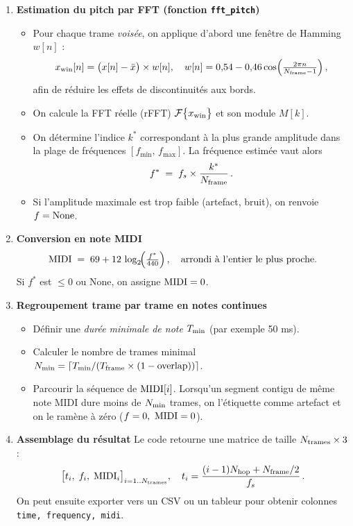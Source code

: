 \begin{enumerate}
\begin{itemize}
    \end{itemize}
  \item \textbf{Estimation du pitch par FFT (fonction \texttt{fft\_pitch}) }  
    \begin{itemize}
      \item Pour chaque trame \emph{voisée}, on applique d’abord une fenêtre de Hamming \(w[n]\) :  
        \[
          x_{\text{win}}[n] = \bigl(x[n] - \bar x\bigr)\times w[n],\quad w[n] = 0{,}54 - 0{,}46\cos\Bigl(\tfrac{2\pi n}{N_\mathrm{frame}-1}\Bigr)\,,
        \]
        afin de réduire les effets de discontinuités aux bords.  
      \item On calcule la FFT réelle (rFFT) \(\mathcal{F}\bigl\{x_{\text{win}}\bigr\}\) et son module \(M[k]\).  
      \item On détermine l’indice \(k^*\) correspondant à la plus grande amplitude dans la plage de fréquences \([f_{\min},\,f_{\max}]\). La fréquence estimée vaut alors  
        \[
          f^* \;=\; f_s \times \frac{k^*}{N_\mathrm{frame}}\,.
        \]
      \item Si l’amplitude maximale est trop faible (artefact, bruit), on renvoie \(f=\text{None}\).  
    \end{itemize}
  \item \textbf{Conversion en note MIDI }  
    \[
      \mathrm{MIDI} \;=\; 69 + 12\,\log_2\!\Bigl(\tfrac{f^*}{440}\Bigr)\,,
      \quad\text{arrondi à l’entier le plus proche.}
    \]
    Si \(f^*\) est \(\le 0\) ou \(\text{None}\), on assigne \(\mathrm{MIDI} = 0\).  
  \item \textbf{Regroupement trame par trame en notes continues }  
    \begin{itemize}
      \item Définir une \emph{durée minimale de note} \(T_\mathrm{min}\) (par exemple 50 ms).  
      \item Calculer le nombre de trames minimal \(N_\mathrm{min} = \lceil T_\mathrm{min} / (T_\mathrm{frame}\times(1-\mathrm{overlap}))\rceil\).  
      \item Parcourir la séquence de \(\mathrm{MIDI}[i]\). Lorsqu’un segment contigu de même note MIDI dure moins de \(N_\mathrm{min}\) trames, on l’étiquette comme artefact et on le ramène à zéro (\(f=0,\ \mathrm{MIDI}=0\)).  
    \end{itemize}
  \item \textbf{Assemblage du résultat }  
    Le code retourne une matrice de taille \(N_\mathrm{trames}\times 3\) :  
    \[
      \bigl[t_i,\;f_i,\;\mathrm{MIDI}_i\bigr]_{i=1..N_\mathrm{trames}}, 
      \quad t_i = \frac{(i-1)N_\mathrm{hop} + N_\mathrm{frame}/2}{f_s}\,.
    \]
    On peut ensuite exporter vers un CSV ou un tableur pour obtenir colonnes \texttt{time, frequency, midi}.  
\end{enumerate}

